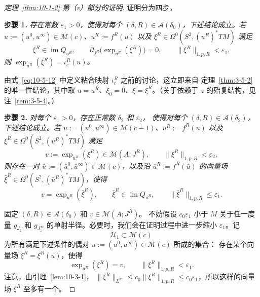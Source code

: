 \begin{proof}[定理~\ref{thm:10-1-2} 第（v）部分的证明]
证明分为四步。

\medskip
\noindent\textbf{步骤 1.}
\emph{存在常数 $\varepsilon_1>0$，使得对每个
$(\delta,R)\in\mathcal A(\delta_0)$，下述结论成立。若
$u:=(u^0,u^\infty)\in\mathcal M(c)$、$u^R:=f^R(u)$ 以及
$\xi^R\in\Omega^0(S^2,(u^R)^*TM)$ 满足}
\[
  \xi^R\in\operatorname{im}Q_{u^R},\qquad
  \bar\partial_{J^R}\bigl(\exp_{u^R}(\xi^R)\bigr)=0,
  \qquad \lVert\xi^R\rVert_{1,p,R}<\varepsilon_1,
\]
\emph{则 $\exp_{u^R}(\xi^R)=\iota_c^R(u)$。}

由式~\eqref{eq:10-5-12} 中定义粘合映射 $\iota_c^R$ 之前的讨论，这立即来自
定理~\ref{thm:3-5-2} 的唯一性结论，其中取
$u=u^R$、$\xi_0=0$、$\xi=\xi^R$。（关于依赖于 $z$ 的殆复结构，见
注~\ref{rem:3-5-4}。）

\medskip
\noindent\textbf{步骤 2.}
\emph{对每个 $\varepsilon_1>0$，存在正常数 $\delta_2$ 和 $\varepsilon_2$，
使得对每个 $(\delta,R)\in\mathcal A(\delta_2)$，下述结论成立。若
$u:=(u^0,u^\infty)\in\mathcal M(c-1)$、$u^R:=f^R(u)$ 以及
$\xi^R\in\Omega^0(S^2,(u^R)^*TM)$ 满足}
\begin{equation}\label{eq:10-7-1}
  v:=\exp_{u^R}(\xi^R)\in\mathcal M(A;J^R),
  \qquad \lVert\xi^R\rVert_{1,p,R}<\varepsilon_2,
\end{equation}
\emph{则存在一对 $\bar u:=(\bar u^0,\bar u^\infty)\in\mathcal M(c)$，以及沿
$\bar u^R:=f^R(\bar u)$ 的向量场
$\bar\xi^R\in\Omega^0(S^2,(\bar u^R)^*TM)$，使得}
\begin{equation}\label{eq:10-7-2}
  v=\exp_{\bar u^R}(\bar\xi^R),\qquad
  \bar\xi^R\in\operatorname{im}Q_{\bar u^R},\qquad
  \lVert\bar\xi^R\rVert_{1,p,R}\leq\varepsilon_1.
\end{equation}

固定 $(\delta,R)\in\mathcal A(\delta_0)$ 和 $v\in\mathcal M(A;J^R)$。
不妨假设 $c_0\varepsilon_1$ 小于 $M$ 关于任一度量 $g_{J_z^0}$ 和
$g_{J_z^\infty}$ 的单射半径。必要时，我们会在证明过程中进一步缩小
$\varepsilon_1$。记
\[
  \mathcal U_1\subset\mathcal M(c)
\]
为所有满足下述条件的偶对 $u:=(u^0,u^\infty)\in\mathcal M(c)$ 所成的集合：
存在某个向量场 $\xi^R=\xi^R(u)$，使得
\begin{equation}\label{eq:10-7-3}
  \exp_{u^R}(\xi^R)=v,\qquad
  \lVert\xi^R\rVert_{1,p,R}<\varepsilon_1.
\end{equation}
注意，由引理~\ref{lem:10-3-1}，
$\lVert\xi^R\rVert_{L^\infty}\leq c_0\lVert\xi^R\rVert_{1,p,R}
\leq c_0\varepsilon_1$，所以这样的向量场 $\xi^R$ 至多有一个。


\end{proof}
